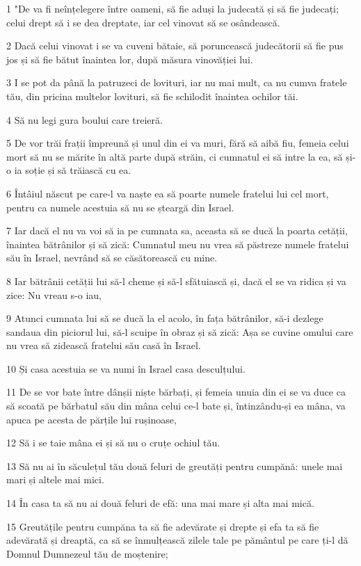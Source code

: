 \par 1 "De va fi neînțelegere între oameni, să fie aduși la judecată și să fie judecați; celui drept să i se dea dreptate, iar cel vinovat să se osândească.
\par 2 Dacă celui vinovat i se va cuveni bătaie, să poruncească judecătorii să fie pus jos și să fie bătut înaintea lor, după măsura vinovăției lui.
\par 3 I se pot da până la patruzeci de lovituri, iar nu mai mult, ca nu cumva fratele tău, din pricina multelor lovituri, să fie schilodit înaintea ochilor tăi.
\par 4 Să nu legi gura boului care treieră.
\par 5 De vor trăi frații împreună și unul din ei va muri, fără să aibă fiu, femeia celui mort să nu se mărite în altă parte după străin, ci cumnatul ei să intre la ea, să și-o ia soție și să trăiască cu ea.
\par 6 Întâiul născut pe care-l va naște ea să poarte numele fratelui lui cel mort, pentru ca numele acestuia să nu se șteargă din Israel.
\par 7 Iar dacă el nu va voi să ia pe cumnata sa, aceasta să se ducă la poarta cetății, înaintea bătrânilor și să zică: Cumnatul meu nu vrea să păstreze numele fratelui său în Israel, nevrând să se căsătorească cu mine.
\par 8 Iar bătrânii cetății lui să-l cheme și să-l sfătuiască și, dacă el se va ridica și va zice: Nu vreau s-o iau,
\par 9 Atunci cumnata lui să se ducă la el acolo, în fața bătrânilor, să-i dezlege sandaua din piciorul lui, să-l scuipe în obraz și să zică: Așa se cuvine omului care nu vrea să zidească fratelui său casă în Israel.
\par 10 Și casa acestuia se va numi în Israel casa desculțului.
\par 11 De se vor bate între dânșii niște bărbați, și femeia unuia din ei se va duce ca să scoată pe bărbatul său din mâna celui ce-l bate și, întinzându-și ea mâna, va apuca pe acesta de părțile lui rușinoase,
\par 12 Să i se taie mâna ei și să nu o cruțe ochiul tău.
\par 13 Să nu ai în săculețul tău două feluri de greutăți pentru cumpănă: unele mai mari și altele mai mici.
\par 14 În casa ta să nu ai două feluri de efă: una mai mare și alta mai mică.
\par 15 Greutățile pentru cumpăna ta să fie adevărate și drepte și efa ta să fie adevărată și dreaptă, ca să se înmulțească zilele tale pe pământul pe care ți-l dă Domnul Dumnezeul tău de moștenire;
